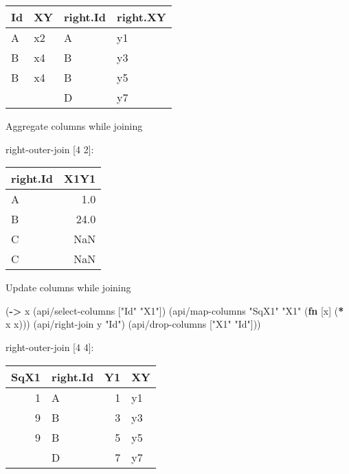 \documentclass[]{article}
\newenvironment{Shaded}{\begin{snugshade}}{\end{snugshade}}
\newcommand{\KeywordTok}[1]{\textcolor[rgb]{0.13,0.29,0.53}{\textbf{#1}}}
\newcommand{\StringTok}[1]{\textcolor[rgb]{0.31,0.60,0.02}{#1}}
\newcommand{\VariableTok}[1]{\textcolor[rgb]{0.00,0.00,0.00}{#1}}
\newcommand{\NormalTok}[1]{#1}
\begin{document}
\begin{longtable}[]{@{}llll@{}}
\toprule
Id & XY & right.Id & right.XY\tabularnewline
\midrule
\endhead
A & x2 & A & y1\tabularnewline
B & x4 & B & y3\tabularnewline
B & x4 & B & y5\tabularnewline
& & D & y7\tabularnewline
\bottomrule
\end{longtable}

Aggregate columns while joining

\begin{Shaded}
\end{Shaded}

right-outer-join {[}4 2{]}:

\begin{longtable}[]{@{}lr@{}}
\toprule
right.Id & X1Y1\tabularnewline
\midrule
\endhead
A & 1.0\tabularnewline
B & 24.0\tabularnewline
C & NaN\tabularnewline
C & NaN\tabularnewline
\bottomrule
\end{longtable}

Update columns while joining

\begin{Shaded}
\begin{Highlighting}[]
\NormalTok{(}\KeywordTok{->}\NormalTok{ x}
\NormalTok{    (api/select-columns [}\StringTok{"Id"} \StringTok{"X1"}\NormalTok{])}
\NormalTok{    (api/map-columns }\StringTok{"SqX1"} \StringTok{"X1"}\NormalTok{ (}\KeywordTok{fn}\NormalTok{ [x] (}\KeywordTok{*}\NormalTok{ x x)))}
\NormalTok{    (api/right-join y }\StringTok{"Id"}\NormalTok{)}
\NormalTok{    (api/drop-columns [}\StringTok{"X1"} \StringTok{"Id"}\NormalTok{]))}
\end{Highlighting}
\end{Shaded}

right-outer-join {[}4 4{]}:

\begin{longtable}[]{@{}rlrl@{}}
\toprule
SqX1 & right.Id & Y1 & XY\tabularnewline
\midrule
\endhead
1 & A & 1 & y1\tabularnewline
9 & B & 3 & y3\tabularnewline
9 & B & 5 & y5\tabularnewline
& D & 7 & y7\tabularnewline
\bottomrule
\end{longtable}
\end{document}
